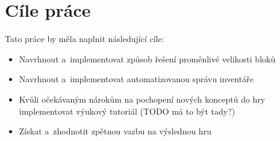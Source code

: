 \section{Cíle práce}
Tato práce by měla naplnit následující cíle:
\begin{itemize}
	\item Navrhnout a~implementovat způsob řešení proměnlivé velikosti bloků
	\item Navrhnout a~implementovat automatizovanou správu inventáře
	\item Kvůli očekávaným nárokům na pochopení nových konceptů do hry implementovat výukový tutoriál (TODO má to být tady?)
	\item Získat a~zhodnotit zpětnou vazbu na výslednou hru
\end{itemize}

